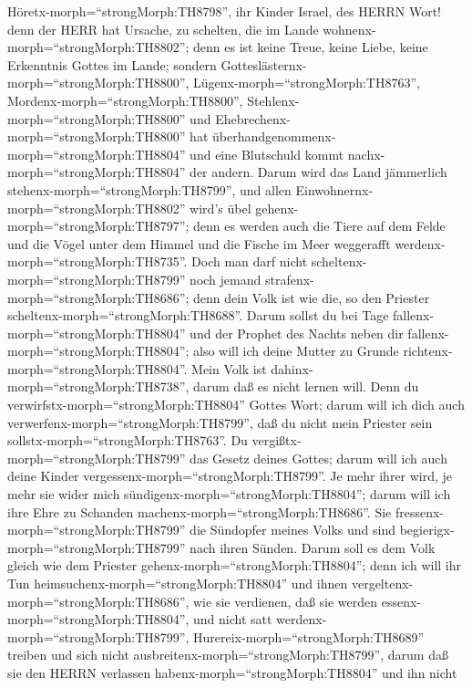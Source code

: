  Höretx-morph=``strongMorph:TH8798'', ihr Kinder Israel, des
HERRN Wort! denn der HERR hat Ursache, zu schelten, die im Lande
wohnenx-morph=``strongMorph:TH8802''; denn es ist keine Treue, keine
Liebe, keine Erkenntnis Gottes im Lande;  sondern
Gotteslästernx-morph=``strongMorph:TH8800'',
Lügenx-morph=``strongMorph:TH8763'',
Mordenx-morph=``strongMorph:TH8800'',
Stehlenx-morph=``strongMorph:TH8800'' und
Ehebrechenx-morph=``strongMorph:TH8800'' hat
überhandgenommenx-morph=``strongMorph:TH8804'' und eine Blutschuld kommt
nachx-morph=``strongMorph:TH8804'' der andern.  Darum wird
das Land jämmerlich stehenx-morph=``strongMorph:TH8799'', und allen
Einwohnernx-morph=``strongMorph:TH8802'' wird's übel
gehenx-morph=``strongMorph:TH8797''; denn es werden auch die Tiere auf
dem Felde und die Vögel unter dem Himmel und die Fische im Meer
weggerafft werdenx-morph=``strongMorph:TH8735''.  Doch man
darf nicht scheltenx-morph=``strongMorph:TH8799'' noch jemand
strafenx-morph=``strongMorph:TH8686''; denn dein Volk ist wie die, so
den Priester scheltenx-morph=``strongMorph:TH8688''.  Darum
sollst du bei Tage fallenx-morph=``strongMorph:TH8804'' und der Prophet
des Nachts neben dir fallenx-morph=``strongMorph:TH8804''; also will ich
deine Mutter zu Grunde richtenx-morph=``strongMorph:TH8804''.
 Mein Volk ist dahinx-morph=``strongMorph:TH8738'', darum
daß es nicht lernen will. Denn du
verwirfstx-morph=``strongMorph:TH8804'' Gottes Wort; darum will ich dich
auch verwerfenx-morph=``strongMorph:TH8799'', daß du nicht mein Priester
sein sollstx-morph=``strongMorph:TH8763''. Du
vergißtx-morph=``strongMorph:TH8799'' das Gesetz deines Gottes; darum
will ich auch deine Kinder vergessenx-morph=``strongMorph:TH8799''.
 Je mehr ihrer wird, je mehr sie wider mich
sündigenx-morph=``strongMorph:TH8804''; darum will ich ihre Ehre zu
Schanden machenx-morph=``strongMorph:TH8686''.  Sie
fressenx-morph=``strongMorph:TH8799'' die Sündopfer meines Volks und
sind begierigx-morph=``strongMorph:TH8799'' nach ihren Sünden.
 Darum soll es dem Volk gleich wie dem Priester
gehenx-morph=``strongMorph:TH8804''; denn ich will ihr Tun
heimsuchenx-morph=``strongMorph:TH8804'' und ihnen
vergeltenx-morph=``strongMorph:TH8686'', wie sie verdienen,
 daß sie werden essenx-morph=``strongMorph:TH8804'', und
nicht satt werdenx-morph=``strongMorph:TH8799'',
Hurereix-morph=``strongMorph:TH8689'' treiben und sich nicht
ausbreitenx-morph=``strongMorph:TH8799'', darum daß sie den HERRN
verlassen habenx-morph=``strongMorph:TH8804'' und ihn nicht

